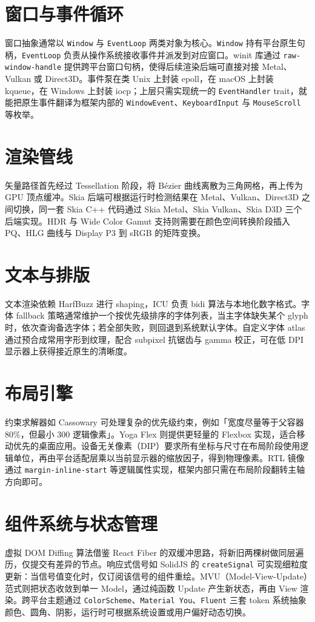\chapter{窗口与事件循环}
窗口抽象通常以 \texttt{Window} 与 \texttt{EventLoop} 两类对象为核心。\texttt{Window} 持有平台原生句柄，\texttt{EventLoop} 负责从操作系统接收事件并派发到对应窗口。winit 库通过 \texttt{raw-window-handle} 提供跨平台窗口句柄，使得后续渲染后端可直接对接 Metal、Vulkan 或 Direct3D。事件泵在类 Unix 上封装 epoll，在 macOS 上封装 kqueue，在 Windows 上封装 iocp；上层只需实现统一的 \texttt{EventHandler} trait，就能把原生事件翻译为框架内部的 \texttt{WindowEvent}、\texttt{KeyboardInput} 与 \texttt{MouseScroll} 等枚举。\par
\chapter{渲染管线}
矢量路径首先经过 Tessellation 阶段，将 Bézier 曲线离散为三角网格，再上传为 GPU 顶点缓冲。Skia 后端可根据运行时检测结果在 Metal、Vulkan、Direct3D 之间切换，同一套 Skia C++ 代码通过 Skia Metal、Skia Vulkan、Skia D3D 三个后端实现。HDR 与 Wide Color Gamut 支持则需要在颜色空间转换阶段插入 PQ、HLG 曲线与 Display P3 到 sRGB 的矩阵变换。\par
\chapter{文本与排版}
文本渲染依赖 HarfBuzz 进行 shaping，ICU 负责 bidi 算法与本地化数字格式。字体 fallback 策略通常维护一个按优先级排序的字体列表，当主字体缺失某个 glyph 时，依次查询备选字体；若全部失败，则回退到系统默认字体。自定义字体 atlas 通过预合成常用字形到纹理，配合 subpixel 抗锯齿与 gamma 校正，可在低 DPI 显示器上获得接近原生的清晰度。\par
\chapter{布局引擎}
约束求解器如 Cassowary 可处理复杂的优先级约束，例如「宽度尽量等于父容器 80\%{}，但最小 300 逻辑像素」。Yoga Flex 则提供更轻量的 Flexbox 实现，适合移动优先的桌面应用。设备无关像素（DIP）要求所有坐标与尺寸在布局阶段使用逻辑单位，再由平台适配层乘以当前显示器的缩放因子，得到物理像素。RTL 镜像通过 \texttt{margin-inline-start} 等逻辑属性实现，框架内部只需在布局阶段翻转主轴方向即可。\par
\chapter{组件系统与状态管理}
虚拟 DOM Diffing 算法借鉴 React Fiber 的双缓冲思路，将新旧两棵树做同层遍历，仅提交有差异的节点。响应式信号如 SolidJS 的 \texttt{createSignal} 可实现细粒度更新：当信号值变化时，仅订阅该信号的组件重绘。MVU（Model-View-Update）范式则把状态收敛到单一 Model，通过纯函数 Update 产生新状态，再由 View 渲染。跨平台主题通过 \texttt{ColorScheme}、\texttt{Material You}、\texttt{Fluent} 三套 token 系统抽象颜色、圆角、阴影，运行时可根据系统设置或用户偏好动态切换。\par
